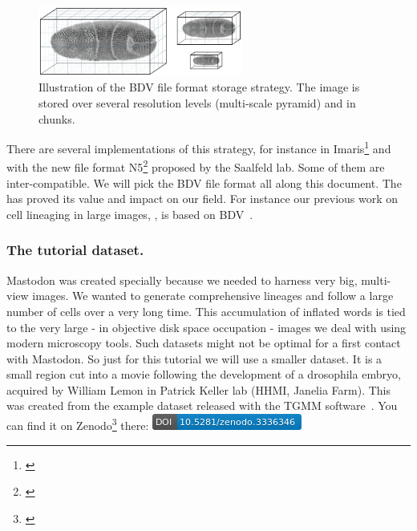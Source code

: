 \begin{figure}
    \centering
    \includegraphics[width=0.6\textwidth]{figures/BdvTikz-pyramidblocks.png}
    \caption{Illustration of the BDV file format storage strategy. The image is stored over several resolution levels (multi-scale pyramid) and in chunks.}
    \label{fig:BDVchunks}
\end{figure}

There are several implementations of this strategy, for instance in Imaris\footnote{\href{http://open.bitplane.com/Default.aspx?tabid=268}{}} and with the new file format N5\footnote{\href{https://github.com/saalfeldlab/n5}{}} proposed by the Saalfeld lab.
Some of them are inter-compatible.
We will pick the BDV file format all along this document. 
The \Bdv has proved its value and impact on our field.
For instance our previous work on cell lineaging in large images, , is based on BDV~\cite{MaMuT}.



\subsubsection{The tutorial dataset.}

Mastodon was created specially because we needed to harness very big, multi-view images. We wanted to generate  comprehensive lineages and follow a large number of cells over a very long time.
This accumulation of inflated words is tied to the very large  - in objective disk space  occupation - images we deal with using modern microscopy tools. 
Such datasets might not be optimal for a first contact with Mastodon.
So just for this tutorial we will use a smaller dataset.
It is a small region cut into a movie following the development of a drosophila embryo, acquired by William Lemon in Patrick Keller lab (HHMI, Janelia Farm).
This was created from the example dataset released with the TGMM software~\cite{TGMMpaper}.
You can find it on Zenodo\footnote{\href{https://zenodo.org/record/3336346}{}} there: \href{https://doi.org/10.5281/zenodo.3336346}{\includegraphics[height=1.5\fontcharht\font`\B]{figures/zenodo3336346.png}}

